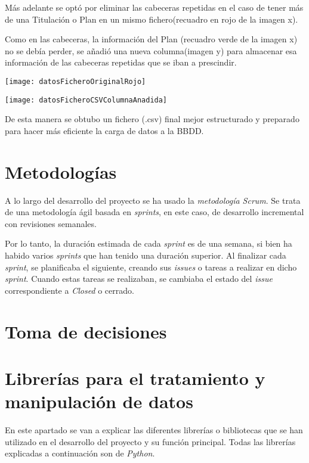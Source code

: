 Más adelante se optó por eliminar las cabeceras repetidas en el caso de tener más de una Titulación o Plan en un mismo fichero(recuadro en rojo de la imagen x).


Como en las cabeceras, la información del Plan (recuadro verde de la imagen x) no se debía perder, se añadió una nueva columna(imagen y) para almacenar esa información de las cabeceras repetidas que se iban a prescindir.

\texttt{[image: datosFicheroOriginalRojo]}


\texttt{[image: datosFicheroCSVColumnaAnadida]}


De esta manera se obtubo un fichero (.csv) final mejor estructurado y preparado para hacer más eficiente la carga de datos a la BBDD.

\section{Metodologías}\label{metodologias}

A lo largo del desarrollo del proyecto se ha usado la \emph{metodología Scrum}. Se trata de una metodología ágil basada en \emph{sprints}, en este caso, de desarrollo incremental con revisiones semanales.

Por lo tanto, la duración estimada de cada \emph{sprint} es de una semana, si bien ha habido varios \emph{sprints} que han tenido una duración superior. Al finalizar cada \emph{sprint}, se planificaba el siguiente, creando sus \emph{issues} o tareas a realizar en dicho \emph{sprint}. Cuando estas tareas se realizaban, se cambiaba el estado del \emph{issue} correspondiente a \emph{Closed} o cerrado.  


\section{Toma de decisiones}\label{toma_de_decisiones}


\section{Librerías para el tratamiento y manipulación de datos}\label{librerias}
En este apartado se van a explicar las diferentes librerías o bibliotecas que se han utilizado en el desarrollo del proyecto y su función principal. Todas las librerías explicadas a continuación son de \emph{Python}.

